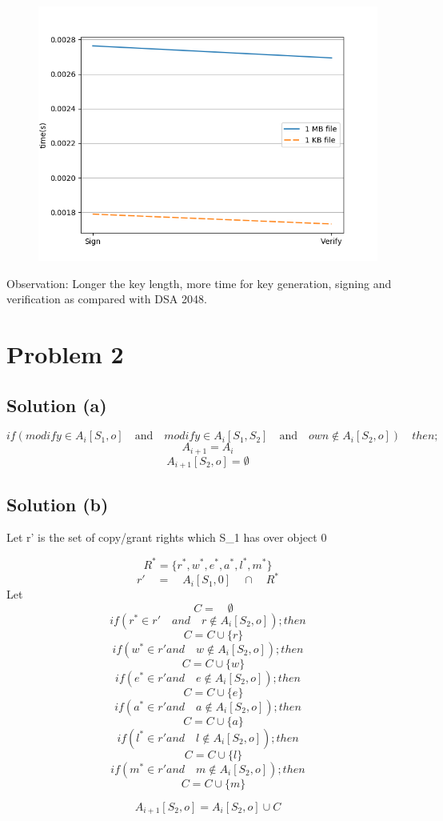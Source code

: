 \documentclass[12pt]{article}%
\begin{document}
\begin{figure}[h]
    \centering
	\includegraphics[scale=0.5]{q1h}
\end{figure}

Observation: 
Longer the key length, more time for key generation, signing and verification as compared with DSA 2048. 

\section{Problem 2}
\subsection{Solution (a)}
\[if ( modify \in A_i[S_1, o]\quad \textrm{and} \quad modify \in A_i[S_1, S_2] \quad \textrm{and}\quad own \notin A_i[S_2,o])\quad then;\]
\[A_{i+1} = A_i\]
\[A_{i+1} [S_2, o] = \emptyset\]
\subsection{Solution (b)}

Let r' is the set of copy/grant rights which S\_1 has over object 0

\[R^* = \{ r^* , w^*, e^*, a^*, l^*, m^* \}\]
 \[r'\quad = \quad A_i[S_1,0] \quad \cap \quad	R^*\]
 Let \[\quad C = \quad \emptyset\]
 \[if(  r^* \in r' \quad and \quad r\notin A_i[S_2, o] ); then\]
 \[\quad C = C \cup \{r\}\]
\[if(  w^* \in r' and \quad w \notin A_i[S_2, o] ); then\]
 \[\quad C = C \cup \{w\}\]
\[if(  e^* \in r' and \quad e \notin A_i[S_2, o]); then\]
 \[\quad C = C \cup \{e\}\]
\[if(  a^* \in r' and \quad a \notin A_i[S_2, o]); then\]
 \[\quad C = C \cup \{a\}\]
\[if(  l^* \in r' and \quad l \notin A_i[S_2, o]); then\]
 \[\quad C = C \cup \{l\}\]
 \[if(  m^* \in r' and \quad m \notin A_i[S_2, o]); then\]
 \[\quad C = C \cup \{m\}\]
 
  \[A_{i+1}[S_2,o]=A_i[S_2,o] \cup C\]
\end{document}
